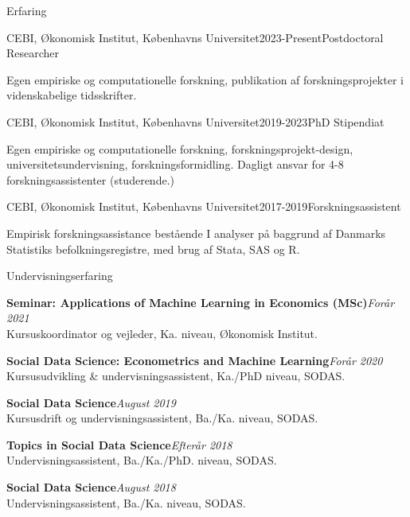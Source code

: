 \documentclass[
	11pt, %
]{resume} %
\begin{document}
\begin{rSection}{Erfaring}
    \begin{rSubsection}{CEBI, Økonomisk Institut, Københavns Universitet}{2023-Present}{Postdoctoral Researcher}{}
        \item[] Egen empiriske og computationelle forskning, publikation af forskningsprojekter i videnskabelige tidsskrifter.
    \end{rSubsection}

    \begin{rSubsection}{CEBI, Økonomisk Institut, Københavns Universitet}{2019-2023}{PhD Stipendiat}{}
        \item[] Egen empiriske og computationelle forskning, forskningsprojekt-design, universitetsundervisning, forskningsformidling. Dagligt ansvar for 4-8 forskningsassistenter (studerende.)
    \end{rSubsection}

    \begin{rSubsection}{CEBI, Økonomisk Institut, Københavns Universitet}{2017-2019}{Forskningsassistent}{}
        \item[] Empirisk forskningsassistance bestående I analyser på baggrund af Danmarks Statistiks befolkningsregistre, med brug af Stata, SAS og R.
    \end{rSubsection}


\end{rSection}

\begin{rSection}{Undervisningserfaring}

    \textbf{Seminar: Applications of Machine Learning in Economics (MSc)}\hfill \textit{Forår 2021} \\
    Kursuskoordinator og vejleder, Ka. niveau, Økonomisk Institut.

    \textbf{Social Data Science: Econometrics and Machine Learning}\hfill \textit{Forår 2020} \\
    Kursusudvikling \& undervisningsassistent, Ka./PhD niveau, SODAS.

    \textbf{Social Data Science}\hfill \textit{August 2019} \\
    Kursusdrift og undervisningsassistent, Ba./Ka. niveau, SODAS.

    \textbf{Topics in Social Data Science}\hfill \textit{Efterår 2018} \\
    Undervisningsassistent, Ba./Ka./PhD. niveau, SODAS.

    \textbf{Social Data Science}\hfill \textit{August 2018} \\
    Undervisningsassistent, Ba./Ka. niveau, SODAS.
\end{rSection}
\end{document}
